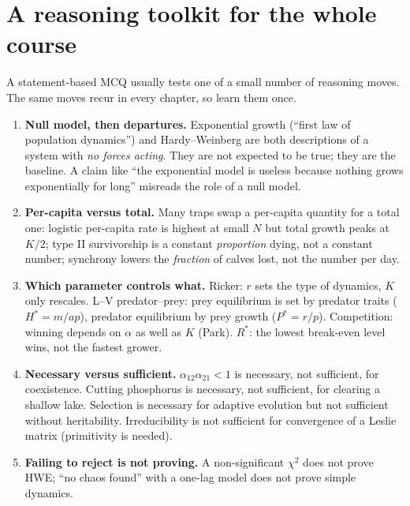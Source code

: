 \section{A reasoning toolkit for the whole course}\label{sec:toolkit}

A statement-based MCQ usually tests one of a small number of reasoning moves. The same moves recur in every chapter, so
learn them once.

\begin{enumerate}
\item \textbf{Null model, then departures.} Exponential growth (``first law of population dynamics'') and
Hardy--Weinberg are both descriptions of a system with \emph{no forces acting}. They are not expected to be true; they are
the baseline. A claim like ``the exponential model is useless because nothing grows exponentially for long'' misreads
the role of a null model.

\item \textbf{Per-capita versus total.} Many traps swap a per-capita quantity for a total one: logistic per-capita rate is
highest at small $N$ but total growth peaks at $K/2$; type II survivorship is a constant \emph{proportion} dying, not a
constant number; synchrony lowers the \emph{fraction} of calves lost, not the number per day.

\item \textbf{Which parameter controls what.} Ricker: $r$ sets the type of dynamics, $K$ only rescales. L--V
predator--prey: prey equilibrium is set by predator traits ($H^*=m/ap$), predator equilibrium by prey growth ($P^*=r/p$).
Competition: winning depends on $\alpha$ as well as $K$ (Park). $R^*$: the lowest break-even level wins, not the fastest
grower.

\item \textbf{Necessary versus sufficient.} $\alpha_{12}\alpha_{21}<1$ is necessary, not sufficient, for coexistence.
Cutting phosphorus is necessary, not sufficient, for clearing a shallow lake. Selection is necessary for adaptive
evolution but not sufficient without heritability. Irreducibility is not sufficient for convergence of a Leslie matrix
(primitivity is needed).

\item \textbf{Failing to reject is not proving.} A non-significant $\chi^2$ does not prove HWE; ``no chaos found'' with a
one-lag model does not prove simple dynamics.


\end{enumerate}
